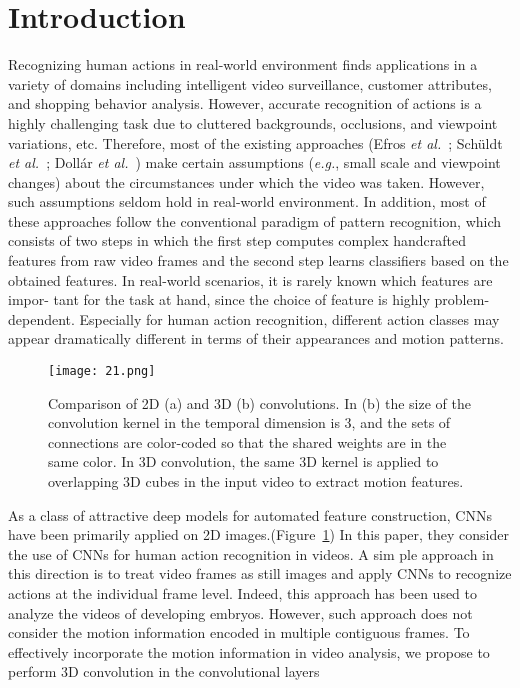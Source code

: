 \documentclass[10pt,twocolumn,letterpaper]{article}
\begin{document}
\section{Introduction}
Recognizing human actions in real-world environment finds applications in a variety of domains including intelligent video surveillance, customer attributes, and shopping behavior analysis. However, accurate recognition of actions is a highly challenging task due to cluttered backgrounds, occlusions, and viewpoint variations, etc. Therefore, most of the existing approaches (Efros \emph{et al.}~\cite{name1}; Schüldt \emph{et al.}~\cite{name2}; Dollár \emph{et al.}~\cite{name3})
make certain assumptions (\emph{e.g.}, small scale and viewpoint changes) about the circumstances under which the video was taken. However, such assumptions seldom hold in real-world environment. In addition, most of these approaches follow the conventional paradigm of pattern recognition, which consists of two steps in which the first step computes complex handcrafted features from raw video frames and the second step learns classifiers based on the obtained features. In real-world scenarios, it is rarely known which features are impor-
tant for the task at hand, since the choice of feature is
highly problem-dependent. Especially for human action recognition, different action classes may appear dramatically different in terms of their appearances and motion patterns.
  \begin{figure}[!htb]
  	\centering
  	\texttt{[image: 21.png]}\\
  	\caption{Comparison of 2D (a) and 3D (b) convolutions.
  		In (b) the size of the convolution kernel in the temporal
  		dimension is 3, and the sets of connections are color-coded
  		so that the shared weights are in the same color. In 3D
  		convolution, the same 3D kernel is applied to overlapping
  		3D cubes in the input video to extract motion features.}\label{Figure1} 
  \end{figure}
\par As a class of attractive deep models for automated feature construction, CNNs have been primarily applied on 2D images.(Figure~\ref{Figure1}) In this paper, they consider the use of CNNs for human action recognition in videos. A sim ple approach in this direction is to treat video frames
as still images and apply CNNs to recognize actions at the individual frame level. Indeed, this approach has been used to analyze the videos of developing embryos. However, such approach does not consider the motion information encoded in multiple contiguous frames. To effectively incorporate the motion information in video analysis, we propose to perform 3D convolution in the convolutional layers
\end{document}
